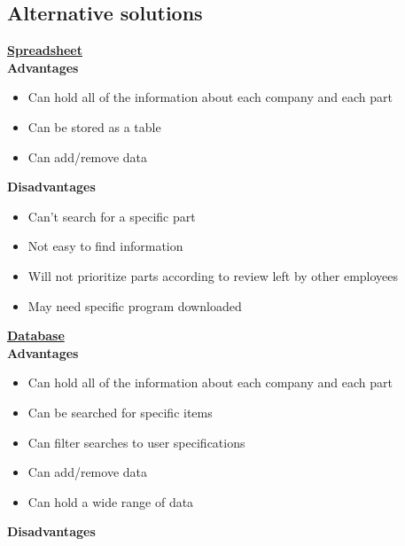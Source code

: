 \subsection{Alternative solutions}
\bf \underline{Spreadsheet}
\\
\bf {Advantages}
\begin{itemize}
	\item Can hold all of the information about each company and each part
	\item Can be stored as a table
	\item Can add/remove data
\end{itemize}
\bf {Disadvantages}
\begin{itemize}
	\item Can't search for a specific part
	\item Not easy to find information
	\item Will not prioritize parts according to review left by other employees
	\item May need specific program downloaded
\end{itemize}
\bf \underline{Database}
\\
\bf {Advantages}
\begin{itemize}
	\item Can hold all of the information about each company and each part
	\item Can be searched for specific items
	\item Can filter searches to user specifications 
	\item Can add/remove data
	\item Can hold a wide range of data
\end{itemize}
\bf {Disadvantages}
